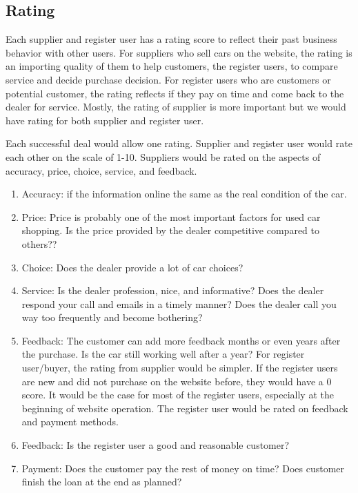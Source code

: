 \documentclass[12pt]{article}
\begin{document}
\subsection{Rating}
Each supplier and register user has a rating score to reflect their past business behavior with other users. For suppliers who sell cars on the website, the rating is an importing quality of them to help customers, the register users, to compare service and decide purchase decision. For register users who are customers or potential customer, the rating reflects if they pay on time and come back to the dealer for service. Mostly, the rating of supplier is more important but we would have rating for both supplier and register user.\par
Each successful deal would allow one rating. Supplier and register user would rate each other on the scale of 1-10. Suppliers would be rated on the aspects of accuracy, price, choice, service, and feedback.\par
\begin{enumerate}
\item Accuracy: if the information online the same as the real condition of the car.
\item Price: Price is probably one of the most important factors for used car shopping. Is the price provided by the dealer competitive compared to others??
\item Choice: Does the dealer provide a lot of car choices?
\item Service: Is the dealer profession, nice, and informative? Does the dealer respond your call and emails in a timely manner? Does the dealer call you way too frequently and become bothering?
\item Feedback: The customer can add more feedback months or even years after the purchase. Is the car still working well after a year? For register user/buyer, the rating from supplier would be simpler. If the register users are new and did not purchase on the website before, they would have a 0 score. It would be the case for most of the register users, especially at the beginning of website operation. The register user would be rated on feedback and payment methods.
\item Feedback: Is the register user a good and reasonable customer?
\item Payment: Does the customer pay the rest of money on time? Does customer finish the loan at the end as planned?
\end{enumerate}
\end{document}
